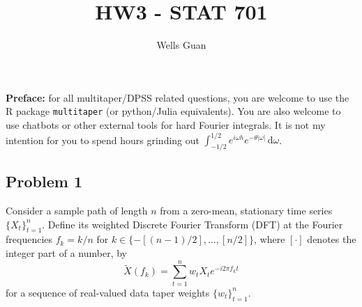 \documentclass[lang=en,11pt,a4paper,citestyle =authoryear,nobib=true]{elegantpaper}
\title{HW3 - STAT 701}
\author{Wells Guan}
\begin{document}
\maketitle

\noindent\textbf{Preface:} for all multitaper/DPSS related questions, you are welcome to use the R package \texttt{multitaper} (or python/Julia equivalents). You are also welcome to use chatbots or other external tools for hard Fourier integrals. It is not my intention for you to spend hours grinding out $\int_{-1/2}^{1/2}e^{i\omega h}e^{-\theta|\omega|}\,\mathrm d\omega$.

\subsection*{Problem 1}
Consider a sample path of length $n$ from a zero-mean, stationary time series $\{X_t\}_{t=1}^n$. Define its weighted Discrete Fourier Transform (DFT) at the Fourier frequencies $f_k=k/n$ for $k\in\{-[(n-1)/2],\ldots,[n/2]\}$, where $[\cdot]$ denotes the integer part of a number, by
\[
\widetilde X(f_k)=\sum_{t=1}^n w_tX_te^{-i2\pi f_kt}
\]
for a sequence of real-valued data taper weights $\{w_t\}_{t=1}^n$.
\end{document}

